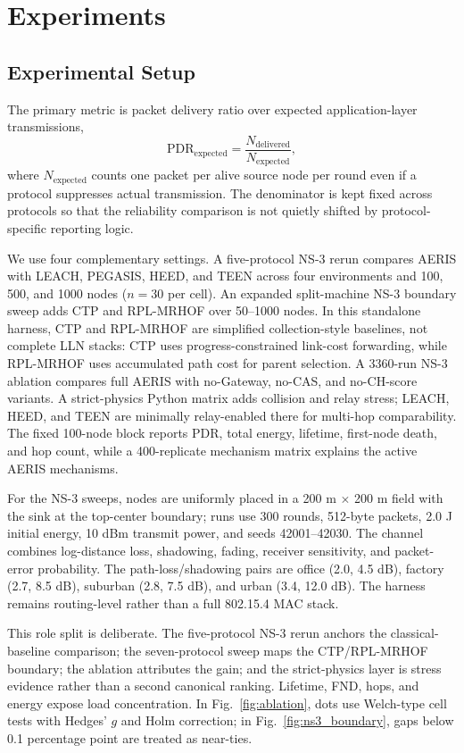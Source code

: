 \documentclass[conference]{IEEEtran}
\begin{document}
\section{Experiments}
\subsection{Experimental Setup}
The primary metric is packet delivery ratio over expected application-layer transmissions,
\begin{equation}
\mathrm{PDR}_{\mathrm{expected}}=\frac{N_{\mathrm{delivered}}}{N_{\mathrm{expected}}},
\end{equation}
where $N_{\mathrm{expected}}$ counts one packet per alive source node per round even if a protocol suppresses actual transmission. The denominator is kept fixed across protocols so that the reliability comparison is not quietly shifted by protocol-specific reporting logic.

We use four complementary settings. A five-protocol NS-3 rerun compares AERIS with LEACH, PEGASIS, HEED, and TEEN across four environments and 100, 500, and 1000 nodes ($n=30$ per cell). An expanded split-machine NS-3 boundary sweep adds CTP and RPL-MRHOF over 50--1000 nodes. In this standalone harness, CTP and RPL-MRHOF are simplified collection-style baselines, not complete LLN stacks: CTP uses progress-constrained link-cost forwarding, while RPL-MRHOF uses accumulated path cost for parent selection. A 3360-run NS-3 ablation compares full AERIS with no-Gateway, no-CAS, and no-CH-score variants. A strict-physics Python matrix adds collision and relay stress; LEACH, HEED, and TEEN are minimally relay-enabled there for multi-hop comparability. The fixed 100-node block reports PDR, total energy, lifetime, first-node death, and hop count, while a 400-replicate mechanism matrix explains the active AERIS mechanisms.

For the NS-3 sweeps, nodes are uniformly placed in a 200 m $\times$ 200 m field with the sink at the top-center boundary; runs use 300 rounds, 512-byte packets, 2.0 J initial energy, 10 dBm transmit power, and seeds 42001--42030. The channel combines log-distance loss, shadowing, fading, receiver sensitivity, and packet-error probability. The path-loss/shadowing pairs are office (2.0, 4.5 dB), factory (2.7, 8.5 dB), suburban (2.8, 7.5 dB), and urban (3.4, 12.0 dB). The harness remains routing-level rather than a full 802.15.4 MAC stack.

This role split is deliberate. The five-protocol NS-3 rerun anchors the classical-baseline comparison; the seven-protocol sweep maps the CTP/RPL-MRHOF boundary; the ablation attributes the gain; and the strict-physics layer is stress evidence rather than a second canonical ranking. Lifetime, FND, hops, and energy expose load concentration. In Fig.~\ref{fig:ablation}, dots use Welch-type cell tests with Hedges' $g$ and Holm correction; in Fig.~\ref{fig:ns3_boundary}, gaps below 0.1 percentage point are treated as near-ties.
\end{document}
